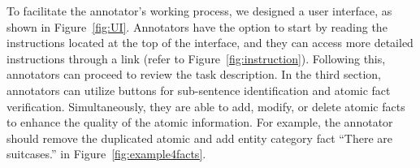 \begin{table}[t]
    \centering \small
    \caption{Correlation between each evaluation metric and human judgment on LVLM hallucinations, measured by Pearson's $r$, Spearman’s $\rho$, and Kendall’s $\tau$.
    }
    \label{tab:allcorrelation}
\end{table}


To facilitate the annotator's working process, we designed a user interface, as shown in Figure~\ref{fig:UI}. Annotators have the option to start by reading the instructions located at the top of the interface, and they can access more detailed instructions through a link (refer to Figure~\ref{fig:instruction}). Following this, annotators can proceed to review the task description. In the third section, annotators can utilize buttons for sub-sentence identification and atomic fact verification. Simultaneously, they are able to add, modify, or delete atomic facts to enhance the quality of the atomic information. For example, the annotator should remove the duplicated atomic and add entity category fact ``There are suitcases.'' in Figure~\ref{fig:example4facts}.  

